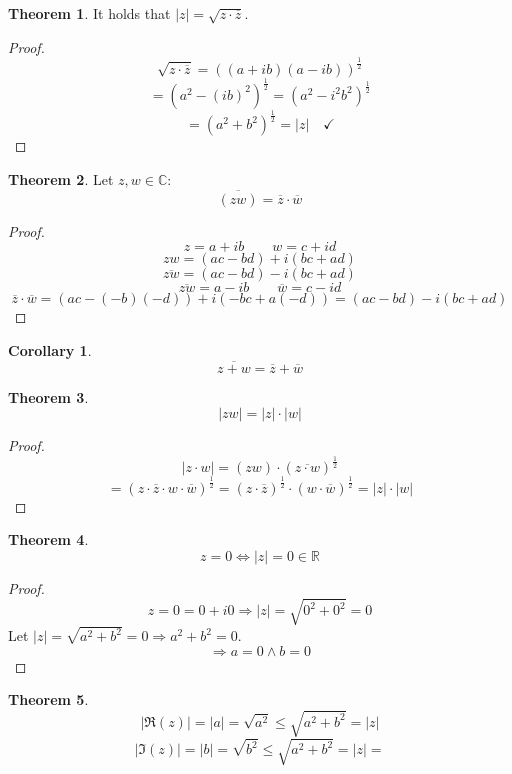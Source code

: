 \documentclass[a4paper,landscape,twocolumn]{article}
\theoremstyle{definition}
\newtheorem{theorem}{Theorem}
\newtheorem{cor}{Corollary}
\newcommand\abs[1]{\left|#1\right|}
\begin{document}
\begin{theorem}
  It holds that $\abs{z} = \sqrt{z \cdot \overline{z}}$.
\end{theorem}

\begin{proof}
  \[ \sqrt{z \cdot \overline{z}} = ((a + ib)(a - ib))^{\frac12} \]
  \[ = (a^2 - (ib)^2)^{\frac12} = (a^2 - i^2 b^2)^{\frac12} \]
  \[ = (a^2 + b^2)^{\frac12} = \abs{z} \quad\checkmark \]
\end{proof}

\begin{theorem}
  Let $z, w \in \mathbb C$:
  \[ \overline{(zw)} = \overline z \cdot \overline w \]
\end{theorem}

\begin{proof}
  \[ z = a + ib \qquad w = c + id \]
  \[ zw = (ac - bd) + i (bc + ad) \]
  \[ \overline{zw} = (ac - bd) - i (bc + ad) \]
  \[ \overline{zw} = a - ib \qquad \overline{w} = c - id \]
  \[
      \overline{z} \cdot \overline{w} = (ac - (-b) (-d)) + i (-bc + a(-d))
        = (ac - bd) - i (bc + ad)
  \]
\end{proof}

\begin{cor}
  \[ \overline{z + w} = \overline{z} + \overline{w} \]
\end{cor}

\begin{theorem}
  \[ \abs{zw} = \abs{z} \cdot \abs{w} \]
\end{theorem}
\begin{proof}
  \[ \abs{z \cdot w} = (zw) \cdot(\overline{z \cdot w})^{\frac12} \]
  \[
      = (z \cdot \overline z \cdot w \cdot \overline w)^{\frac12}
      = (z \cdot \overline z)^{\frac12} \cdot (w \cdot \overline w)^{\frac12}
      = \abs{z} \cdot \abs{w}
  \]
\end{proof}

\begin{theorem}
  \[ z = 0 \Leftrightarrow \abs{z} = 0 \in \mathbb R \]
\end{theorem}

\begin{proof}
  \[ z = 0 = 0 + i 0 \Rightarrow \abs{z} = \sqrt{0^2 + 0^2} = 0 \]
  Let $\abs{z} = \sqrt{a^2 + b^2} = 0 \Rightarrow a^2 + b^2 = 0$.
  \[ \Rightarrow a = 0 \land b = 0 \]
\end{proof}

\begin{theorem}
  \[ \abs{\Re(z)} = \abs{a} = \sqrt{a^2} \leq \sqrt{a^2 + b^2} = \abs{z} \]
  \[ \abs{\Im(z)} = \abs{b} = \sqrt{b^2} \leq \sqrt{a^2 + b^2} = \abs{z} = \]
\end{theorem}
\end{document}
